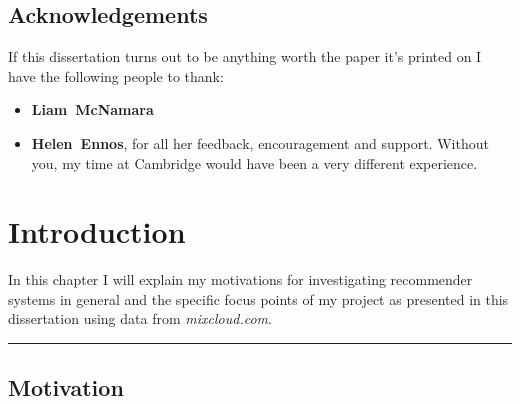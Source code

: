 \documentclass[a4paper,12pt,twoside,notitlepage]{report}
\def\mixurl{\emph{mixcloud.com}}
\newcommand{\rulewidth}{300pt}
\newcommand{\halfrule}{
  \begin{center}
    {\rule{\rulewidth}{0.5pt}}
  \end{center}}
\begin{document}
\medskip
{}


\newpage


\section*{Acknowledgements}

If this dissertation turns out to be anything worth the paper it's printed on I
have the following people to thank:

\begin{itemize}
 \item {\bf Liam~McNamara}
 \item {\bf Helen~Ennos}, for all her feedback, encouragement and support.
Without you, my time at Cambridge would have been a very different experience. 
\end{itemize}

\clearpage

\tableofcontents
\clearpage

\clearpage
\listoffigures

\clearpage
\listoftables

\clearpage



\setcounter{page}{1}
\setcounter{chapter}{0}
\pagestyle{headings}


\chapter{Introduction}


In this chapter I will explain my motivations for investigating recommender
systems in general and the specific focus points of my project as
presented in this dissertation using data from \mixurl.

\halfrule

\section{Motivation}
\end{document}
